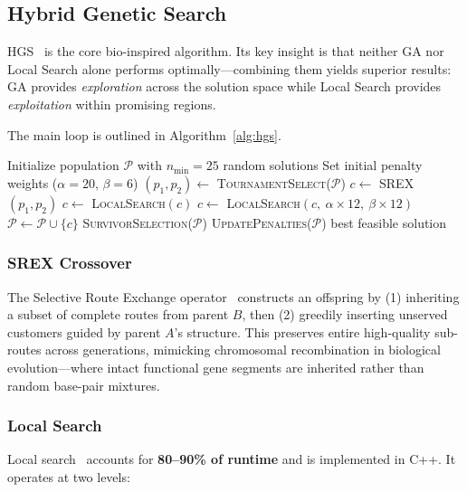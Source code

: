 \documentclass[conference]{IEEEtran}
\begin{document}
\subsection{Hybrid Genetic Search}

HGS~\cite{wouda2024pyvrp,vidal2013hybrid} is the core bio-inspired
algorithm. Its key insight is that neither GA nor Local Search alone performs
optimally---combining them yields superior results: GA provides
\textit{exploration} across the solution space while Local Search provides
\textit{exploitation} within promising regions.

The main loop is outlined in Algorithm~\ref{alg:hgs}.

\begin{algorithm}
\caption{HGS Main Loop}\label{alg:hgs}
\begin{algorithmic}[1]
\State Initialize population $\mathcal{P}$ with $n_{\min}=25$ random solutions
\State Set initial penalty weights ($\alpha=20$, $\beta=6$)
\Repeat
  \State $(p_1, p_2) \leftarrow$ \textsc{TournamentSelect}($\mathcal{P}$)
  \State $c \leftarrow$ \textsc{SREX}$(p_1, p_2)$
  \State $c \leftarrow$ \textsc{LocalSearch}$(c)$
    \State $c \leftarrow$ \textsc{LocalSearch}$(c,\ \alpha\times12,\ \beta\times12)$
  \EndIf
  \State $\mathcal{P} \leftarrow \mathcal{P} \cup \{c\}$
    \State \textsc{SurvivorSelection}($\mathcal{P}$)
  \EndIf
  \State \textsc{UpdatePenalties}($\mathcal{P}$) 
\State \Return best feasible solution
\end{algorithmic}
\end{algorithm}

\subsubsection{SREX Crossover}
The Selective Route Exchange operator~\cite{nagata2010memetic} constructs
an offspring by (1) inheriting a subset of complete routes from parent $B$,
then (2) greedily inserting unserved customers guided by parent $A$'s
structure. This preserves entire high-quality sub-routes across generations,
mimicking chromosomal recombination in biological evolution---where intact
functional gene segments are inherited rather than random base-pair mixtures.

\subsubsection{Local Search}
Local search~\cite{wouda2024pyvrp} accounts for \textbf{80--90\% of
runtime} and is implemented in C++. It operates at two levels:
\end{document}
